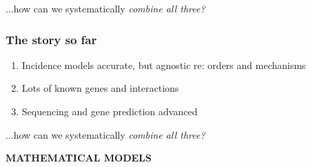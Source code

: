 {\begin{frame}
    \begin{center}
        ...how can we systematically \emph{combine all three?}
    \end{center}
    
    \begin{center}
        \vphantom{MATHEMATICAL MODELS}
    \end{center}
\end{frame}

\begin{frame}
    \frametitle{The story so far}
    \begin{enumerate}
        \item Incidence models accurate, but agnostic re: orders and mechanisms
        \item Lots of known genes and interactions
        \item Sequencing and gene prediction advanced
    \end{enumerate}

    \begin{center}
        ...how can we systematically \emph{combine all three?}
    \end{center}
    
    \begin{center}
        \textbf{\Large{MATHEMATICAL MODELS}}
    \end{center}
\end{frame}
}
